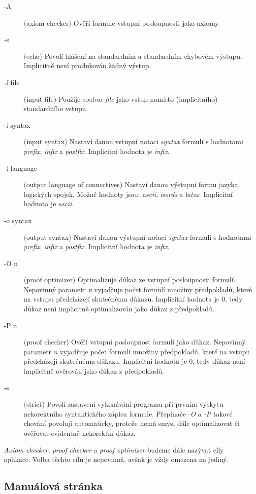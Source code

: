 \documentclass[thesis=B,czech,hidelinks]{thesis}[2012/06/26]
\begin{document}
\begin{description}
	\item[-A] (axiom checker) Ověří formule vstupní posloupnosti jako axiomy.
	\item[-e] (echo) Povolí hlášení na standardním a standardním chybovém výstupu. Implicitně není produkován žádný výstup.
	\item[-f file] (input file) Použije soubor \emph{file} jako vstup namísto (implicitního) standardního vstupu.
	\item[-i syntax] (input syntax) Nastaví danou vstupní notaci \emph{syntax} formulí s hodnotami \emph{prefix}, \emph{infix} a \emph{postfix}. Implicitní hodnota je \emph{infix}.
	\item[-l language] (output language of connectives) Nastaví danou výstupní formu jazyka logických spojek. Možné hodnoty jsou: \emph{ascii}, \emph{words} a \emph{latex}. Implicitní hodnota je \emph{ascii}.
	\item[-o syntax] (output syntax) Nastaví danou výstupní notaci \emph{syntax} formulí s hodnotami \emph{prefix}, \emph{infix} a \emph{postfix}. Implicitní hodnota je \emph{infix}.
	\item[-O n] (proof optimizer) Optimalizuje důkaz ze vstupní posloupnosti formulí. Nepovinný parametr \emph{n} vyjadřuje počet formulí množiny předpokladů, které na vstupu předcházejí skutečnému důkazu. Implicitní hodnota je 0, tedy důkaz není implicitně optimalizován jako důkaz z předpokladů.
	\item[-P n] (proof checker) Ověří vstupní posloupnost formulí jako důkaz. Nepovinný parametr \emph{n} vyjadřuje počet formulí množiny předpokladů, které na vstupu předcházejí skutečnému důkazu. Implicitní hodnota je 0, tedy důkaz není implicitně ověrován jako důkaz z předpokladů.
	\item[-s] (strict) Povolí zastavení vykonávání programu při prvním výskytu nekorektního syntaktického zápisu formule. Přepínače \emph{-O} a \emph{-P} takové chování povolují automaticky, protože nemá smysl dále optimalizovat či ověřovat evidentně nekorektní důkaz.
\end{description}

\emph{Axiom checker}, \emph{proof checker} a \emph{proof optimizer} budeme dále nazývat cíly aplikace. Volba těchto cílů je nepovinná, avšak je vždy omezena na jediný.

\subsection{Manuálová stránka}
\end{document}
